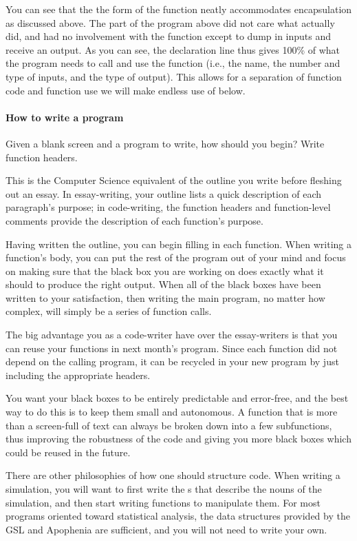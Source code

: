 You can see that the the form of the function neatly accommodates
encapsulation as discussed above.  
The  part of the program above did not care what
 actually did, and had no involvement with the
function except to dump in inputs and receive an output. As you can see,
the declaration line thus gives 100\% of what the program needs to call
and use the function (i.e., the name, the number and type of inputs,
and the type of output). This allows for a separation of function code
and function use we will make endless use of below.

\paragraph{How to write a program}
Given a blank screen and a program to write, how should you begin?
Write function headers.

This is the Computer Science equivalent of the outline you write before
fleshing out an essay. In essay-writing, your outline lists a quick
description of each paragraph's purpose; in code-writing, the function
headers and function-level comments provide the description of each
function's purpose.

Having written the outline, you can begin filling in each function.
When writing a function's body, you can put the rest of the program out of
your mind and focus on making sure that the black box you are working on
does exactly what it should to produce the right output. When all of the
black boxes have been written to your satisfaction, then writing the main
program, no matter how complex, will simply be a series of function calls.

The big advantage you as a code-writer have over the essay-writers is
that you can reuse your functions in next month's program.  Since each
function did not depend on the calling program, it can be recycled in
your new program by just including the appropriate headers.

You want your black boxes to be entirely predictable and error-free,
and the best way to do this is to keep them small and autonomous. A
function that is more than a screen-full of text can always be broken
down into a few subfunctions, thus improving the robustness of the code
and giving you more black boxes which could be reused in the future.

There are other philosophies of how one should structure code.  When
writing a simulation, you will want to first write the s that
describe the nouns of the simulation, and then start writing functions
to manipulate them.  For most programs oriented toward statistical
analysis, the data structures provided by the GSL and Apophenia are
sufficient, and you will not need to write your own.


